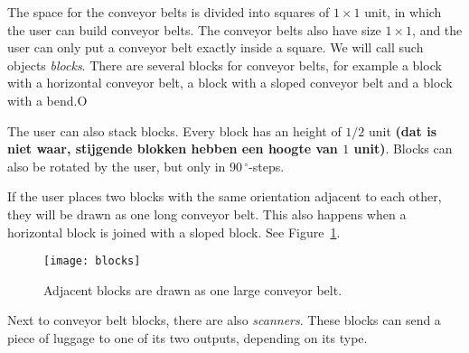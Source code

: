 The space for the conveyor belts is divided into squares of $1 \times 1$ unit, in which the user can build conveyor belts. The conveyor belts also have size $1 \times 1$, and the user can only put a conveyor belt exactly inside a square. We will call such objects \textit{blocks}. There are several blocks for conveyor belts, for example a block with a horizontal conveyor belt, a block with a sloped conveyor belt and a block with a bend.O

The user can also stack blocks. Every block has an height of $1/2$ unit \textbf{(dat is niet waar, stijgende blokken hebben een hoogte van $1$ unit)}. Blocks can also be rotated by the user, but only in $90\,^\circ$-steps.

If the user places two blocks with the same orientation adjacent to each other, they will be drawn as one long conveyor belt. This also happens when a horizontal block is joined with a sloped block. See Figure~\ref{fig:blocks}.

\begin{figure}
  \begin{center}
    \texttt{[image: blocks]}
    \caption{Adjacent blocks are drawn as one large conveyor belt.}
    \label{fig:blocks}
  \end{center}
\end{figure}

Next to conveyor belt blocks, there are also \textit{scanners}. These blocks can send a piece of luggage to one of its two outputs, depending on its type.